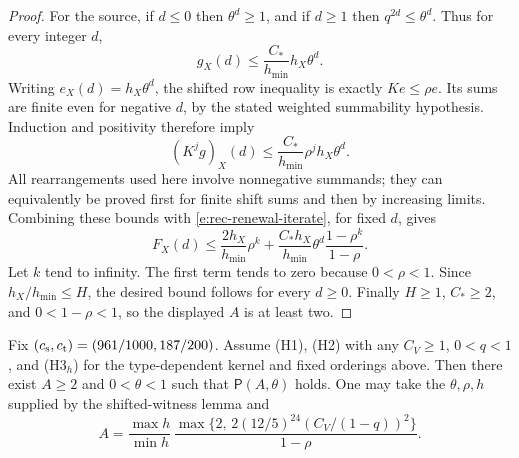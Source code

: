 \begin{proof}
For the source, if \(d\le0\) then \(\theta^d\ge1\), and if
\(d\ge1\) then \(q^{2d}\le\theta^d\).  Thus for every integer
\(d\),
\[
 g_X(d)\le\frac{C_*}{h_{\min}}h_X\theta^d.
\]
Writing \(e_X(d)=h_X\theta^d\), the shifted row inequality is
exactly \(Ke\le\rho e\).  Its sums are finite even for
negative \(d\), by the stated weighted summability hypothesis.
Induction and positivity therefore imply
\[
 (K^jg)_X(d)\le\frac{C_*}{h_{\min}}\rho^jh_X\theta^d.
\]
All rearrangements used here involve nonnegative summands; they
can equivalently be proved first for finite shift sums and then
by increasing limits.  Combining these bounds with
\eqref{e:rec-renewal-iterate}, for fixed \(d\), gives
\[
 F_X(d)\le\frac{2h_X}{h_{\min}}\rho^k
    +\frac{C_*h_X}{h_{\min}}\theta^d
                       \frac{1-\rho^k}{1-\rho}.
\]
Let \(k\) tend to infinity.  The first term tends to zero
because \(0<\rho<1\).  Since \(h_X/h_{\min}\le H\),
the desired bound follows for every \(d\ge0\).
Finally \(H\ge1\), \(C_*\ge2\), and \(0<1-\rho<1\),
so the displayed \(A\) is at least two.
\end{proof}

\begin{theorem}\label{t:rec}
Fix \((c_{\rm s},c_{\rm t})=(961/1000,187/200)\).
Assume (H1), (H2) with any \(C_V\ge1\), \(0<q<1\), and
(H3\(_h\)) for the type-dependent kernel and fixed orderings above.
Then there exist \(A\ge2\) and \(0<\theta<1\) such that
\(\mathsf P(A,\theta)\) holds.
One may take the \(\theta,\rho,h\) supplied by the shifted-witness
lemma and
\[
 A=\frac{\max h}{\min h}\,
       \frac{\max\{2,\,2(12/5)^{24}(C_V/(1-q))^2\}}{1-\rho}.
\]
\end{theorem}

